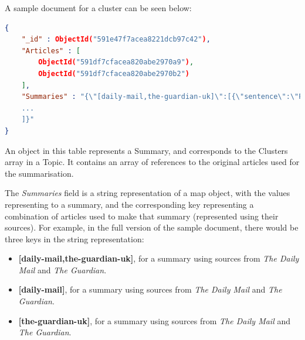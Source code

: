 \documentclass[12pt]{article}
\begin{document}
A sample document for a cluster can be seen below:

\begin{lstlisting}[language=json, firstnumber=1, caption={A sample document in the Summaries table}]
{
    "_id" : ObjectId("591e47f7acea8221dcb97c42"),
    "Articles" : [ 
        ObjectId("591df7cfacea820abe2970a9"), 
        ObjectId("591df7cfacea820abe2970b2")
    ],
    "Summaries" : "{\"[daily-mail,the-guardian-uk]\":[{\"sentence\":\"President Donald Trump says he's 'very close' to naming an FBI director.\",\"sentencePosition\":0.0,\"absoluteSentencePosition\":0,\"identifier\":0,\"relatedNodes\":[],\"source\":\"daily-mail\"},{\"sentence\":\"Trump confirmed Thursday afternoon that former Democratic Sen. Joe Lieberman is a favorite for the position.\",\"sentencePosition\":0.019230769230769232,\"absoluteSentencePosition\":1,\"identifier\":1,\"relatedNodes\":[],\"source\":\"daily-mail\"},{\"sentence\":\"'We're very close to an FBI director,' Trump told reporters shouting questions at him as he met with the Colombian president in the Oval Office.\",\"sentencePosition\":0.038461538461538464,\"absoluteSentencePosition\":2,\"identifier\":2,\"relatedNodes\":[],\"source\":\"daily-mail\"},{\"sentence\":\"'Soon,' he added.\",\"sentencePosition\":0.057692307692307696,\"absoluteSentencePosition\":3,\"identifier\":3,\"relatedNodes\":[],\"source\":\"daily-mail\"}
    ...
    ]}"
}
\end{lstlisting}

An object in this table represents a Summary, and corresponds to the Clusters array in a Topic. It contains an array of references to the original articles used for the summarisation.

The \emph{Summaries} field is a string representation of a map object, with the values representing to a summary, and the corresponding key representing a combination of articles used to make that summary (represented using their sources). For example, in the full version of the sample document, there would be three keys in the string representation:

\begin{itemize}
	\item \textbf{[daily-mail,the-guardian-uk]}, for a summary using sources from \emph{The Daily Mail} and \emph{The Guardian}.
	\item \textbf{[daily-mail]}, for a summary using sources from \emph{The Daily Mail} and \emph{The Guardian}.
	\item \textbf{[the-guardian-uk]}, for a summary using sources from \emph{The Daily Mail} and \emph{The Guardian}. \\
\end{itemize}
\end{document}
